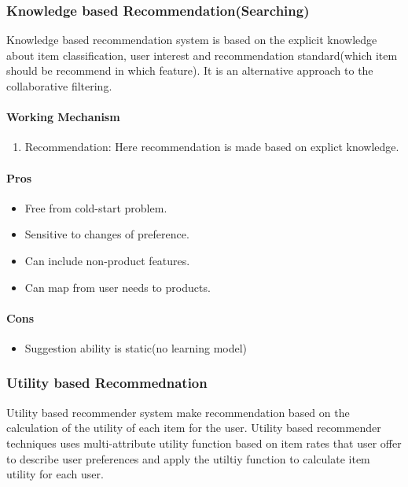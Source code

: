 \subsubsection{Knowledge based Recommendation(Searching)}
Knowledge based recommendation system \cite{recommend} is based on the explicit knowledge about item classification, user interest and recommendation standard(which item should be recommend in which feature). It is an alternative approach to the collaborative filtering.
\paragraph{Working Mechanism}\hfill

\begin{enumerate}
	\item Recommendation: Here recommendation is made based on explict knowledge.
\end{enumerate}
\paragraph{Pros}\hfill

\begin{itemize}
	\item Free from cold-start problem.
	\item Sensitive to changes of preference.
	\item Can include non-product features.
	\item Can map from user needs to products.
\end{itemize}
\paragraph{Cons}\hfill

\begin{itemize}
	\item Suggestion ability is static(no learning model)
\end{itemize}

\subsubsection{Utility based Recommednation}
Utility based recommender system make recommendation based on the calculation of the utility of each item for the user. Utility based recommender techniques uses multi-attribute utility function based on item rates that user offer to describe user preferences and apply the utiltiy function to calculate item utility for each user.
